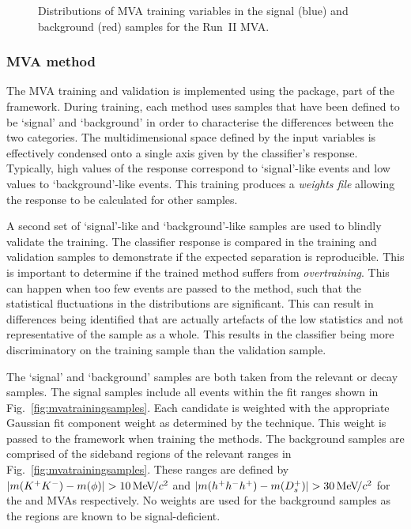 \begin{figure}[!h]
\begin{subfigure}[t]{0.22\textwidth}
   \end{subfigure}
   \caption{Distributions of MVA training variables in the signal (blue) and background (red) samples for the Run~II \decay{\Dsp}{\Kp\Km\pip} MVA.}
   \label{fig:mvatrainingvariables_Ds}   
\end{figure}


\subsubsection{MVA method}
\label{sec:mvamethod}

The MVA training and validation is implemented using the \tmva package, part of the \root framework.
During training, each method uses samples that have been defined to be `signal' and `background' in order to characterise the differences between the two categories. The multidimensional space defined by the input variables is effectively condensed onto a single axis given by the classifier's response. Typically, high values of the response correspond to `signal'-like events and low values to `background'-like events. This training produces a \emph{weights file} allowing the response to be calculated for other samples. 

A second set of `signal'-like and `background'-like samples are used to blindly validate the training. The classifier response is compared in the training and validation samples to demonstrate if the expected separation is reproducible. 
This is important to determine if the trained method suffers from \emph{overtraining}. This can happen when too few events are passed to the method, such that the statistical fluctuations in the distributions are significant. This can result in differences being identified that are actually artefacts of the low statistics and not representative of the sample as a whole. This results in the classifier being more discriminatory on the training sample than the validation sample.

The `signal' and `background' samples are both taken from the relevant \decay{\Bsb}{\Dsp\pim} or \decay{\Bs}{\jpsi\phiz} decay samples.
The signal samples include all events within the fit ranges shown in Fig.~\ref{fig:mvatrainingsamples}. Each candidate is weighted with the appropriate Gaussian fit component weight as determined by the \sPlot technique. This weight is passed to the \tmva framework when training the methods.
The background samples are comprised of the sideband regions of the relevant ranges in Fig.~\ref{fig:mvatrainingsamples}. These ranges are defined by $|m({{K}^+}{{K}^-})-m(\phi)| > 10 {\mathrm{\,Me\kern -0.1em V\!/}c^2}$ and $|m(h^{+}h^{-}h^{+})-m({{D}^+_{s}})| > 30{\mathrm{\,Me\kern -0.1em V\!/}c^2}$ for the \phiz and \Dsp MVAs respectively. No weights are used for the background samples as the regions are known to be signal-deficient.



